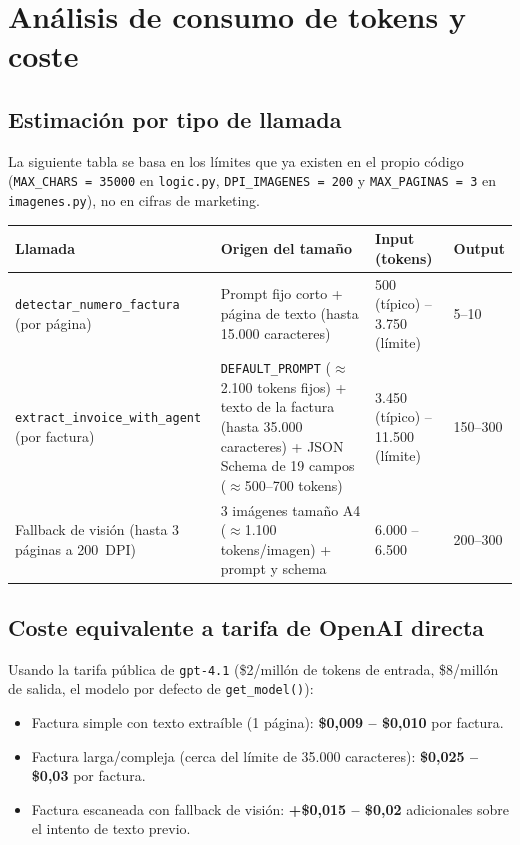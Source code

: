 \documentclass[11pt,a4paper]{article}
\begin{document}
\section{Análisis de consumo de tokens y coste}
\label{sec:coste}

\subsection{Estimación por tipo de llamada}

La siguiente tabla se basa en los límites que ya existen en el propio código
(\texttt{MAX\_CHARS = 35000} en \texttt{logic.py}, \texttt{DPI\_IMAGENES = 200} y
\texttt{MAX\_PAGINAS = 3} en \texttt{imagenes.py}), no en cifras de marketing.

\begin{longtable}{@{}p{4cm}p{5.5cm}p{2.3cm}p{1.8cm}@{}}
\toprule
\textbf{Llamada} & \textbf{Origen del tamaño} & \textbf{Input (tokens)} & \textbf{Output} \\
\midrule
\endhead
\texttt{detectar\_numero\_factura} (por página) &
Prompt fijo corto + página de texto (hasta 15.000 caracteres) &
500 (típico) -- 3.750 (límite) & 5--10 \\
\addlinespace
\texttt{extract\_invoice\_with\_agent} (por factura) &
\texttt{DEFAULT\_PROMPT} ($\approx$2.100 tokens fijos) + texto de la factura
(hasta 35.000 caracteres) + JSON Schema de 19 campos ($\approx$500--700 tokens) &
3.450 (típico) -- 11.500 (límite) & 150--300 \\
\addlinespace
Fallback de visión (hasta 3 páginas a 200~DPI) &
3 imágenes tamaño A4 ($\approx$1.100 tokens/imagen) + prompt y schema &
6.000 -- 6.500 & 200--300 \\
\bottomrule
\end{longtable}

\subsection{Coste equivalente a tarifa de OpenAI directa}

Usando la tarifa pública de \texttt{gpt-4.1} (\$2/millón de tokens de entrada,
\$8/millón de salida, el modelo por defecto de \texttt{get\_model()}):

\begin{itemize}
    \item Factura simple con texto extraíble (1 página): \textbf{\$0,009 -- \$0,010} por factura.
    \item Factura larga/compleja (cerca del límite de 35.000 caracteres): \textbf{\$0,025 -- \$0,03} por factura.
    \item Factura escaneada con fallback de visión: \textbf{+\$0,015 -- \$0,02} adicionales sobre el intento de texto previo.
\end{itemize}
\end{document}
